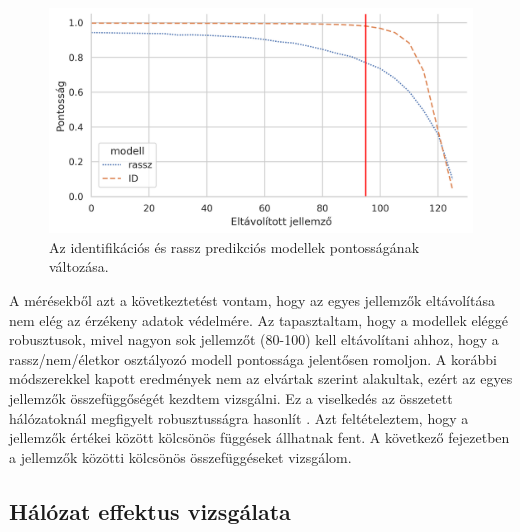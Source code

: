 \begin{figure}[ht]
	\centering
	\includegraphics[width=0.9\columnwidth]{figures/imp_race_id_graph.png}
	\caption{Az identifikációs és rassz predikciós modellek pontosságának változása.}
	\label{fig:retrain}
\end{figure}

A mérésekből azt a következtetést vontam, hogy az egyes jellemzők eltávolítása nem elég az érzékeny adatok védelmére. Az tapasztaltam, hogy a modellek eléggé robusztusok, mivel nagyon sok jellemzőt (80-100) kell eltávolítani ahhoz, hogy a rassz/nem/életkor osztályozó modell pontossága jelentősen romoljon. A korábbi módszerekkel kapott eredmények nem az elvártak szerint alakultak, ezért az egyes jellemzők összefüggőségét kezdtem vizsgálni. Ez a viselkedés az összetett hálózatoknál megfigyelt robusztusságra hasonlít \cite{albert2000error}. Azt feltételeztem, hogy a jellemzők értékei között kölcsönös függések állhatnak fent. A következő fejezetben a jellemzők közötti kölcsönös összefüggéseket vizsgálom.

% 


\subsection{Hálózat effektus vizsgálata}

